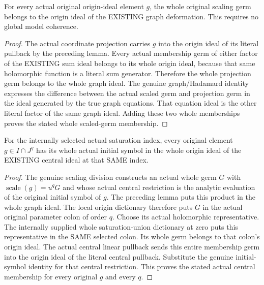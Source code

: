 \begin{lemma}
\label{hir:real-domain-whole-scaled-original-graph-membership}
\leanok
For every actual original origin-ideal element $g$, the whole original
scaling germ belongs to the origin ideal of the EXISTING graph
deformation. This requires no global model coherence.
\end{lemma}
\begin{proof}
The actual coordinate projection carries $g$ into the origin ideal of
its literal pullback by the preceding lemma. Every actual membership
germ of either factor of the EXISTING sum ideal belongs to its whole
origin ideal, because that same holomorphic function is a literal sum
generator. Therefore the whole projection germ belongs to the whole
graph ideal. The genuine graph/Hadamard identity expresses the
difference between the actual scaled germ and projection germ in the
ideal generated by the true graph equations. That equation ideal is
the other literal factor of the same graph ideal. Adding these two
whole memberships proves the stated whole scaled-germ membership.
\end{proof}

\begin{lemma}
\label{hir:real-domain-all-original-initial-symbol-central-membership}
\leanok
For the internally selected actual saturation index, every original
element $g\in I\cap J^q$ has its whole actual initial symbol in the
whole origin ideal of the EXISTING central ideal at that SAME index.
\end{lemma}
\begin{proof}
The genuine scaling division constructs an actual whole germ $G$ with
$\operatorname{scale}(g)=u^qG$ and whose actual central restriction is
the analytic evaluation of the original initial symbol of $g$.
The preceding lemma puts this product in the whole graph ideal. The
local origin dictionary therefore puts $G$ in the actual original
parameter colon of order $q$. Choose its actual holomorphic
representative. The internally supplied whole saturation-union
dictionary at zero puts this representative in the SAME selected
colon. Its whole germ belongs to that colon's origin ideal. The actual
central linear pullback sends this entire membership germ into the
origin ideal of the literal central pullback. Substitute the genuine
initial-symbol identity for that central restriction. This proves the
stated actual central membership for every original $g$ and every $q$.
\end{proof}


